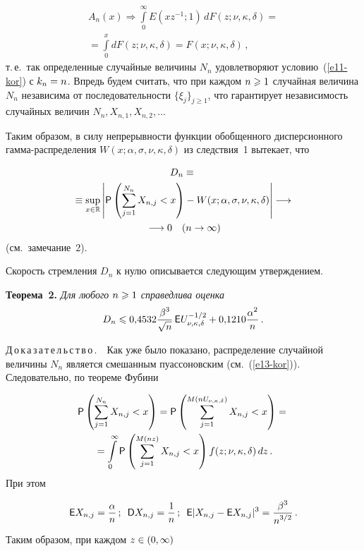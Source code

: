 \begin{multicols}{2}
\pagebreak

\noindent
\begin{multline*}
A_n(x)\Longrightarrow\int\limits_{0}^{\infty}E(xz^{-1};1)\,dF(z;\nu,\kappa,\delta)={}\\
{}=
\int\limits_{0}^{x}dF(z;\nu,\kappa,\delta)=F(x;\nu,\kappa,\delta)\,,
\end{multline*}
т.\,е.\ так определенные случайные величины $N_n$ удовле\-тво\-ря\-ют
условию~(\ref{e11-kor}) с $k_n\hm=n$. Впредь будем считать, что при каждом $n\hm\geqslant1$
случайная величина $N_n$ независима от последовательности
$\{\xi_j\}_{j\geqslant1}$, что гарантирует независимость случайных величин
$N_n,X_{n,1},X_{n,2},\ldots$

Таким образом, в силу непрерывности функции обобщенного
дисперсионного гам\-ма-рас\-пре\-де\-ле\-ния
$W(x;\alpha,\sigma,\nu,\kappa,\delta)$ из следствия~1 вытекает, что

\noindent
\begin{multline*}
D_n\equiv{}\\
{}\equiv \sup\limits_{x\in\mathbb{R}}\left\vert
{\sf P}\left(\sum\limits_{j=1}^{N_n}X_{n,j}<x\right)-
W(x;\alpha,\sigma,\nu,\kappa,\delta)
\right\vert\longrightarrow{}\\
{}\longrightarrow 0\quad (n\to\infty)
\end{multline*}
(см.\ замечание~2).

Скорость стремления $D_n$ к нулю описывается следующим утверждением.

\smallskip

\noindent
\textbf{Теорема~2.} \textit{Для любого $n\hm\geqslant1$ справедлива оценка}
$$
D_n\leqslant 0{,}4532\displaystyle\frac{\displaystyle \beta^3\mathstrut}{\displaystyle \sqrt{n}\mathstrut}\,{\sf E}U_{\nu,\kappa,\delta}^{-1/2} +
0{,}1210\displaystyle\frac{\displaystyle \alpha^2\mathstrut}{\displaystyle n\mathstrut}\,.
$$

\smallskip

\noindent
Д\,о\,к\,а\,з\,а\,т\,е\,л\,ь\,с\,т\,в\,о\,.\ \  Как уже было показано, распределение
случайной величины $N_n$ является смешанным пуассоновским (см.~(\ref{e13-kor})). 
Следовательно, по теореме Фубини

\noindent
\begin{multline*}
{\sf P}\left(\sum\limits_{j=1}^{N_n}X_{n,j}<x\right)=
{\sf P}\left(\sum\limits_{j=1}^{M(nU_{\nu,\kappa,\delta})}X_{n,j}<x\right)={}\\
{}=
\int\limits_0^{\infty}{\sf P}\left(\sum\limits_{j=1}^{M(nz)}X_{n,j}<x\right)f(z;\nu,\kappa,\delta)\,dz\,.
\end{multline*}
При этом

\noindent
$$
{\sf E}X_{n,j}=\displaystyle\frac{\displaystyle \alpha\mathstrut}{\displaystyle n\mathstrut}\,;\enskip {\sf D}X_{n,j}=\displaystyle\frac{\displaystyle 1\mathstrut}{\displaystyle n\mathstrut}\,;\enskip
{\sf E}|X_{n,j}-{\sf E}X_{n,j}|^3=\displaystyle\frac{\displaystyle \beta^3\mathstrut}{\displaystyle n^{3/2}\mathstrut}\,.
$$
Таким образом, при каждом $z\hm\in(0,\infty)$


\end{multicols}
